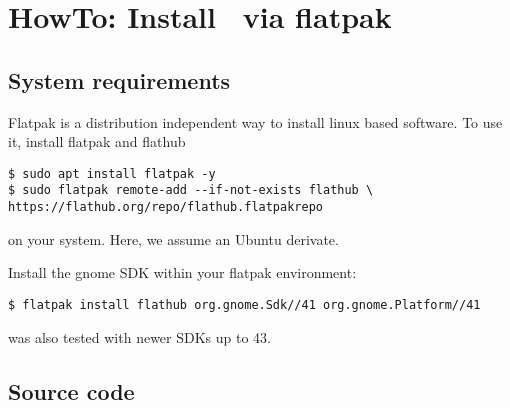 
\chapter{HowTo: Install \Gxsm\ via flatpak}

\section{System requirements}
Flatpak is a distribution independent way to install linux based software. To use it, install flatpak and flathub
\begin{verbatim}
$ sudo apt install flatpak -y
$ sudo flatpak remote-add --if-not-exists flathub \
https://flathub.org/repo/flathub.flatpakrepo
\end{verbatim}
on your system. Here, we assume an Ubuntu derivate. 

Install the gnome SDK within your flatpak environment:

\begin{verbatim}
$ flatpak install flathub org.gnome.Sdk//41 org.gnome.Platform//41
\end{verbatim}

\Gxsm was also tested with newer SDKs up to 43.

\section{Source code}

